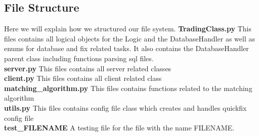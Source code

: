 \documentclass[a4paper, 11pt]{article}
\begin{document}
\noindent
{}

\subsection*{File Structure}
Here we will explain how we structured our file system.
\textbf{TradingClass.py} This files contains all logical objects for the Logic and the DatabaseHandler as well as enums for database and fix
related tasks. It also contains the DatabaseHandler parent class including functions parsing sql files. \\
\textbf{server.py} This files contains all server related classes \\
\textbf{client.py} This files contains all client related class \\
\textbf{matching\_algorithm.py} This files contains functions related to the matching algorithm \\
\textbf{utils.py} This files contains config file class which creates and handles quickfix config file \\
\textbf{test\_FILENAME} A testing file for the file with the name FILENAME. 
\end{document}

